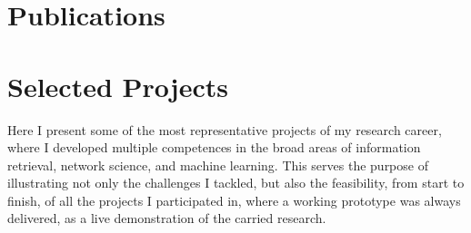 \documentclass{friggeri-cv}
\newif\ifselectedprojects
\begin{document}
\section{Publications}

\clearpage
{}


\ifselectedprojects

\section{Selected Projects}

Here I present some of the most representative projects of my research career, where I developed multiple competences in the broad areas of information retrieval, network science, and machine learning. This serves the purpose of illustrating not only the challenges I tackled, but also the feasibility, from start to finish, of all the projects I participated in, where a working prototype was always delivered, as a live demonstration of the carried research.\\[1em]
\end{document}
